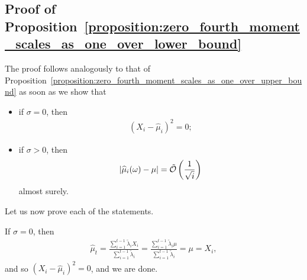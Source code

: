 \subsection{Proof of Proposition~\ref{proposition:zero_fourth_moment_scales_as_one_over_lower_bound}} \label{proof:zero_fourth_moment_scales_as_one_over_lower_bound}

The proof follows analogously to that of Proposition~\ref{proposition:zero_fourth_moment_scales_as_one_over_upper_bound} as soon as we show that
\begin{itemize}
    \item if $\sigma=0$, then 
    \begin{align*}
        (X_i - \widehat\mu_i)^2 = 0; %
    \end{align*}
    \item if $\sigma>0$, then 
    \begin{align*}
        |\widehat\mu_i(\omega) - \mu| = \tilde {\mathcal{O}} \left( \frac{1}{\sqrt i}\right)
    \end{align*}
    almost surely.
\end{itemize}
Let us now prove each of the statements. 

If $\sigma=0$, then
\begin{align*}
    \widehat\mu_t = \frac{\sum_{i=1}^{t-1} \tilde \lambda_i X_i}{\sum_{i=1}^{t-1} \tilde \lambda_i} = \frac{\sum_{i=1}^{t-1} \tilde \lambda_i \mu}{\sum_{i=1}^{t-1} \tilde \lambda_i} = \mu = X_i,
\end{align*}
and so $(X_i - \widehat\mu_i)^2 = 0$, and we are done.

